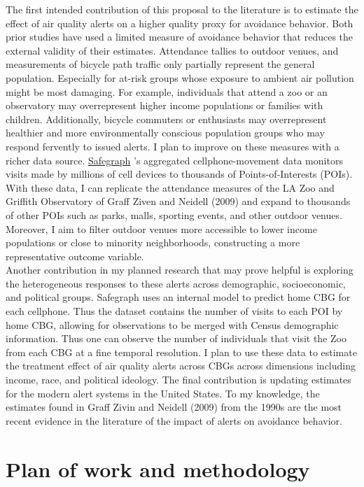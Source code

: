 \documentclass[12pt]{article}
\begin{document}
The first intended contribution of this proposal to the literature is to estimate the effect of air quality alerts on a higher quality proxy for avoidance behavior. Both prior studies have used a limited measure of avoidance behavior that reduces the external validity of their estimates. Attendance tallies to outdoor venues, and measurements of bicycle path traffic only partially represent the general population. Especially for at-risk groups whose exposure to ambient air pollution might be most damaging. For example, individuals that attend a zoo or an observatory may overrepresent higher income populations or families with children. Additionally, bicycle commuters or enthusiasts may overrepresent healthier and more environmentally conscious population groups who may respond fervently to issued alerts. I plan to improve on these measures with a richer data source. \href{https://docs.safegraph.com/docs/weekly-patterns}{Safegraph} 's aggregated cellphone-movement data monitors visits made by millions of cell devices to thousands of Points-of-Interests (POIs). With these data, I can replicate the attendance measures of the LA Zoo and Griffith Observatory of Graff Ziven and Neidell (2009) and expand to thousands of other POIs such as parks, malls, sporting events, and other outdoor venues. Moreover, I aim to filter outdoor venues more accessible to lower income populations or close to minority neighborhoods, constructing a more representative outcome variable. \\

Another contribution in my planned research that may prove helpful is exploring the heterogeneous responses to these alerts across demographic, socioeconomic, and political groups. Safegraph uses an internal model to predict home CBG for each cellphone. Thus the dataset contains the number of visits to each POI by home CBG, allowing for observations to be merged with Census demographic information. Thus one can observe the number of individuals that visit the Zoo from each CBG at a fine temporal resolution. I plan to use these data to estimate the treatment effect of air quality alerts across CBGs across dimensions including income, race, and political ideology. The final contribution is updating estimates for the modern alert systems in the United States. To my knowledge, the estimates found in Graff Zivin and Neidell (2009) from the 1990s are the most recent evidence in the literature of the impact of alerts on avoidance behavior.


\section{Plan of work and methodology}
\end{document}
